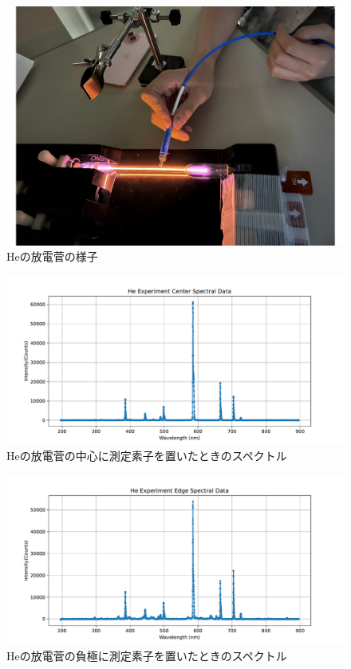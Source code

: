\documentclass[a4j,twocolumn]{jsarticle}
\begin{document}
\begin{figure}[htb]
    \centering
    \includegraphics[keepaspectratio,width=0.6\columnwidth]{fig/latexmkrc.pdf}
    \caption{Heの放電菅の様子}
\end{figure}
\begin{figure}[htb]
    \centering
    \includegraphics[keepaspectratio,width=0.6\columnwidth]{fig/He_center.pdf}
    \caption{Heの放電菅の中心に測定素子を置いたときのスペクトル}
\end{figure}
\begin{figure}[htb]
    \centering
    \includegraphics[keepaspectratio,width=0.6\columnwidth]{fig/He_edge.pdf}
    \caption{Heの放電菅の負極に測定素子を置いたときのスペクトル}
\end{figure}



















\end{document}
